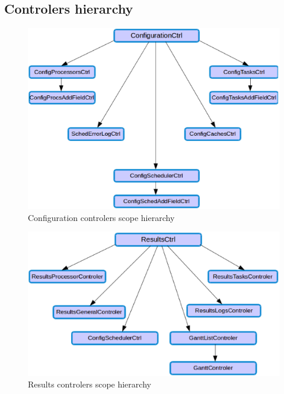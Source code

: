 \documentclass[10pt,a4paper]{article}
\begin{document}
\subsection{Controlers hierarchy}
\begin{figure}[h]
\centering
\includegraphics[scale=0.50]{figure3.eps}
\caption{Configuration controlers scope hierarchy}
\end{figure}

\begin{figure}[h]
\centering
\includegraphics[scale=0.50]{figure4.eps}
\caption{Results controlers scope hierarchy}
\end{figure}
\end{document}
